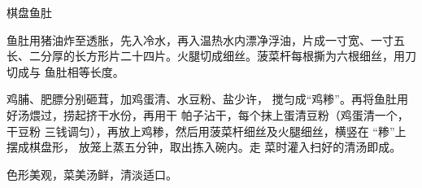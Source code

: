 \begin{recipe}{棋盘鱼肚}

\ingredients


\preparation

\step 鱼肚用猪油炸至透胀，先入冷水，再入温热水内漂净浮油，片成一寸宽、一寸五
长、二分厚的长方形片二十四片。火腿切成细丝。菠菜杆每根撕为六根细丝，用刀切成与
鱼肚相等长度。

\step 鸡脯、肥膘分别砸茸，加鸡蛋清、水豆粉、盐少许， 搅匀成“鸡糁”。再将鱼肚用
好汤煨过，捞起挤干水份，再用干 帕子沾干，每个抹上蛋清豆粉（鸡蛋清一个，干豆粉
三钱调匀），再放上鸡糁，然后用菠菜杆细丝及火腿细丝，横竖在 “糁”上摆成棋盘形，
放笼上蒸五分钟，取出拣入碗内。走 菜时灌入扫好的清汤即成。

\features

色形美观，菜美汤鲜，清淡适口。

\end{recipe}

